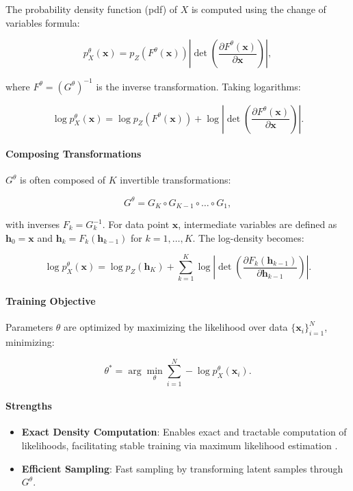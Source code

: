 The probability density function (pdf) of $X$ is computed using the change of variables formula:

\[
p^\theta_X(\mathbf{x}) = p_Z\left(F^\theta(\mathbf{x})\right) \left| \det \left( \frac{\partial F^\theta(\mathbf{x})}{\partial \mathbf{x}} \right) \right|,
\]

\noindent where $F^\theta = (G^\theta)^{-1}$ is the inverse transformation. Taking logarithms:

\[
\log p^\theta_X(\mathbf{x}) = \log p_Z\left(F^\theta(\mathbf{x})\right) + \log \left| \det \left( \frac{\partial F^\theta(\mathbf{x})}{\partial \mathbf{x}} \right) \right|.
\]

\paragraph{Composing Transformations}

$G^\theta$ is often composed of $K$ invertible transformations:

\[
G^\theta = G_K \circ G_{K-1} \circ \dots \circ G_1,
\]

\noindent with inverses $F_k = G_k^{-1}$. For data point $\mathbf{x}$, intermediate variables are defined as $\mathbf{h}_0 = \mathbf{x}$ and $\mathbf{h}_k = F_k(\mathbf{h}_{k-1})$ for $k = 1, \dots, K$. The log-density becomes:

\[
\log p^\theta_X(\mathbf{x}) = \log p_Z(\mathbf{h}_K) + \sum_{k=1}^{K} \log \left| \det \left( \frac{\partial F_k(\mathbf{h}_{k-1})}{\partial \mathbf{h}_{k-1}} \right) \right|.
\]

\paragraph{Training Objective}

Parameters $\theta$ are optimized by maximizing the likelihood over data $\{\mathbf{x}_i\}_{i=1}^N$, minimizing:

\[
\theta^* = \arg \min_{\theta} \sum_{i=1}^N -\log p^\theta_X(\mathbf{x}_i).
\]

\paragraph{Strengths}

\begin{itemize}
    \item \textbf{Exact Density Computation}: Enables exact and tractable computation of likelihoods, facilitating stable training via maximum likelihood estimation \cite{papamakarios2019normalizing}.
    \item \textbf{Efficient Sampling}: Fast sampling by transforming latent samples through $G^\theta$.
\end{itemize}

